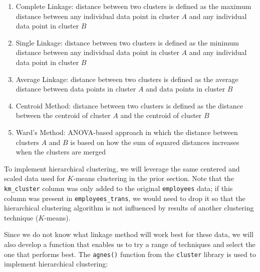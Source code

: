 \documentclass[
]{book}
\providecommand{\tightlist}{%
  \setlength{\itemsep}{0pt}\setlength{\parskip}{0pt}}
\begin{document}
\begin{enumerate}
\def\labelenumi{\arabic{enumi}.}
\tightlist
\item
  Complete Linkage: distance between two clusters is defined as the maximum distance between any individual data point in cluster \(A\) and any individual data point in cluster \(B\)
\item
  Single Linkage: distance between two clusters is defined as the minimum distance between any individual data point in cluster \(A\) and any individual data point in cluster \(B\)
\item
  Average Linkage: distance between two clusters is defined as the average distance between data points in cluster \(A\) and data points in cluster \(B\)
\item
  Centroid Method: distance between two clusters is defined as the distance between the centroid of cluster \(A\) and the centroid of cluster \(B\)
\item
  Ward's Method: ANOVA-based approach in which the distance between clusters \(A\) and \(B\) is based on how the sum of squared distances increases when the clusters are merged
\end{enumerate}

To implement hierarchical clustering, we will leverage the same centered and scaled data used for \(K\)-means clustering in the prior section. Note that the \texttt{km\_cluster} column was only added to the original \texttt{employees} data; if this column was present in \texttt{employees\_trans}, we would need to drop it so that the hierarchical clustering algorithm is not influenced by results of another clustering technique (\(K\)-means).

Since we do not know what linkage method will work best for these data, we will also develop a function that enables us to try a range of techniques and select the one that performs best. The \texttt{agnes()} function from the \texttt{cluster} library is used to implement hierarchical clustering:
\end{document}
